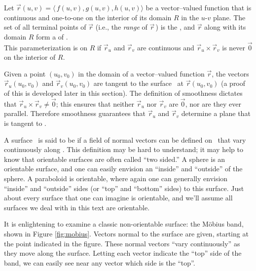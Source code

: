 {Let $\vec r(u,v) = \langle\, f(u,v),g(u,v),h(u,v)\rangle$ be a vector--valued function
that is continuous and one-to-one on the interior of its domain $R$ in the $u$-$v$ plane. The set of all terminal points of $\vec r$ (i.e., the \emph{range} of $\vec r$\,) is the  \surfaceS, and $\vec r$ along with its domain $R$ form a  of \surfaceS.\\

This parameterization is  on $R$ if $\vec r_u$ and $\vec r_v$ are continuous and $\vec r_u\times \vec r_v$ is never $\vec 0$ on the interior of $R$.
}


Given a point $(u_0,v_0)$ in the domain of a vector--valued function $\vec r$, the vectors $\vec r_u(u_0,v_0)$ and $\vec r_v(u_0,v_0)$ are tangent to the surface \surfaceS\ at $\vec r(u_0,v_0)$ (a proof of this is developed later in this section). The definition of smoothness dictates that $\vec r_u\times \vec r_v \neq \vec 0$; this ensures that neither $\vec r_u$ nor $\vec r_v$ are $\vec 0$, nor are they ever parallel. Therefore smoothness guarantees that $\vec r_u$ and $\vec r_v$ determine a plane that is tangent to \surfaceS.

A surface \surfaceS\ is said to be  if a field of normal vectors can be defined on \surfaceS\ that vary continuously along \surfaceS. This definition may be hard to understand; it may help to know that orientable surfaces are often called ``two sided.'' A sphere is an orientable surface, and one can easily envision an ``inside'' and ``outside'' of the sphere. A paraboloid is orientable, where again one can generally envision  ``inside'' and ``outside'' sides (or ``top'' and ``bottom'' sides) to this surface. Just about every surface that one can imagine is orientable, and we'll assume all surfaces we deal with in this text are orientable.

It is enlightening to examine a classic non-orientable surface: the M\"obius band, shown in Figure \ref{fig:mobius}. Vectors normal to the surface are given, starting at the point indicated in the figure. These normal vectors ``vary continuously'' as they move along the surface. Letting each vector indicate the ``top'' side of the band, we can easily see near any vector which side is the ``top''.

